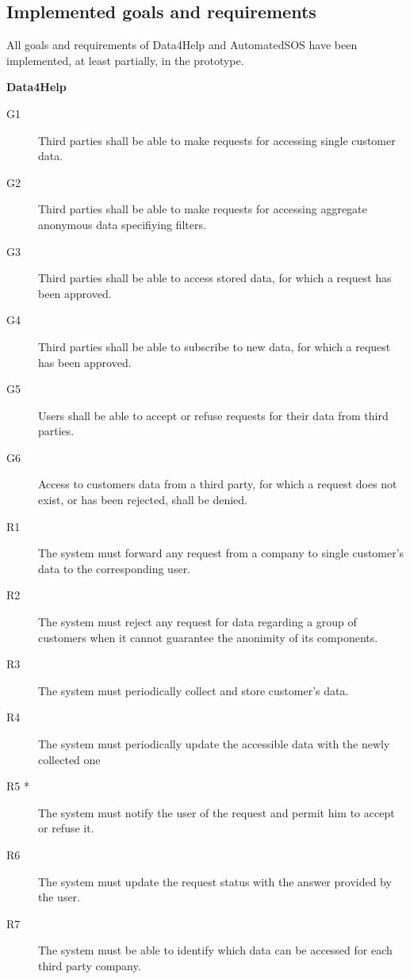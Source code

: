 \documentclass[../main.tex]{subfiles}
\begin{document}
\subsection{Implemented goals and requirements}

	All goals and requirements of Data4Help and AutomatedSOS have been implemented, at least partially, in the prototype.

	\vspace{1cm}

	{\bf Data4Help}

	\vspace{0.5cm}

	\begin{description}
		\item [G1]  Third parties shall be able to make requests for accessing single customer data.
		\item [G2]  Third parties shall be able to make requests for accessing aggregate anonymous data specifiying filters.
		\item [G3]  Third parties shall be able to access stored data, for which a request has been approved.
		\item [G4]  Third parties shall be able to subscribe to new data, for which a request has been approved.
		\item [G5]  Users shall be able to accept or refuse requests for their data from third parties.
		\item [G6]  Access to customers data from a third party, for which a request does not exist, or has been rejected, shall be denied.

		\item [R1] The system must forward any request from a company to single customer's data to the corresponding user.
		\item [R2] The system must reject any request for data regarding a group of customers when it cannot guarantee the anonimity of its components.
		\item [R3] The system must periodically collect and store customer's data.
		\item [R4] The system must periodically update the accessible data with the newly collected one
		\item [R5 *] The system must notify the user of the request and permit him to accept or refuse it.
		\item [R6] The system must update the request status with the answer provided by the user.
		\item [R7] The system must be able to identify which data can be accessed for each third party company.

	\end{description}
\end{document}
